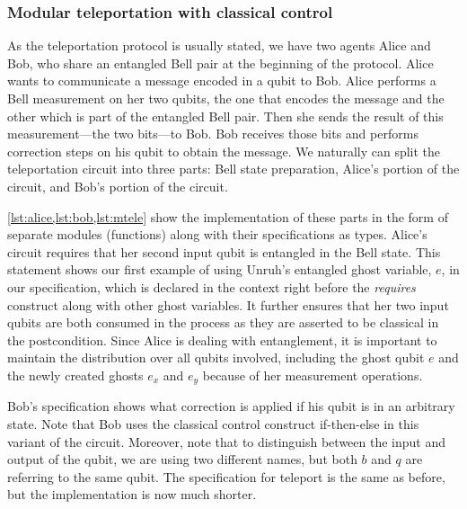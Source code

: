 \documentclass[adraft,creativecommons]{eptcs}
\theoremstyle{definition}
\theoremstyle{remark}
\begin{document}
\subsubsection{Modular teleportation with classical control}

As the teleportation protocol is usually stated, we have two agents Alice and Bob, who share an entangled Bell pair at the beginning of the protocol. Alice wants to communicate a message encoded in a qubit to Bob. Alice performs a Bell measurement on her two qubits, the one that encodes the message and the other which is part of the entangled Bell pair. Then she sends the result of this measurement---the two bits---to Bob. Bob receives those bits and performs correction steps on his qubit to obtain the message. We naturally can split the teleportation circuit into three parts: Bell state preparation, Alice's portion of the circuit, and Bob's portion of the circuit.







\cref{lst:alice,lst:bob,lst:mtele} show the implementation of these parts in the form of separate modules (functions) along with their specifications as types. Alice's circuit requires that her second input qubit is entangled in the Bell state. This statement shows our first example of using Unruh's entangled ghost variable, $e$, in our specification, which is declared in the context right before the \textit{requires} construct along with other ghost variables. It further ensures that her two input qubits are both consumed in the process as they are asserted to be classical in the postcondition. Since Alice is dealing with entanglement, it is important to maintain the distribution over all qubits involved, including the ghost qubit $e$ and the newly created ghosts $e_x$ and $e_y$ because of her measurement operations.

Bob's specification shows what correction is applied if his qubit is in an arbitrary state. Note that Bob uses the classical control construct if-then-else in this variant of the circuit. Moreover, note that to distinguish between the input and output of the qubit, we are using two different names, but both $b$ and $q$ are referring to the same qubit. The specification for teleport is the same as before, but the implementation is now much shorter.
\end{document}

